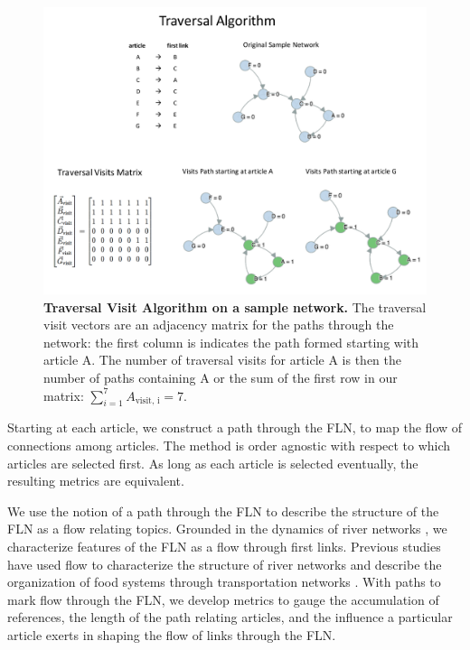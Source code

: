 \documentclass[pre,twocolumn,twoside,superscriptaddress,floatfix, aps, 10pt]{revtex4-1}
\begin{document}
\begin{figure}[tp!]
  \includegraphics[width=\textwidth]{graphics/traversal_visit_algo_figure.pdf}  
  \caption{
    \textbf{Traversal Visit Algorithm on a sample network.}
     The traversal visit vectors are an adjacency matrix for the paths through the network: the first column is indicates the path formed starting with article A. The number of traversal visits for article A is then the number of paths containing A or the sum of the first row in our matrix:
     $\sum_{i=1}^7 A_{\text{visit, i}} = 7$.
  }
  \label{fig:Traversal Visits}
\end{figure}

Starting at each article, we construct a path through the FLN, 
to map the flow of connections among articles.
The method is order agnostic with respect to which articles are selected first. As long as each article is selected eventually, the resulting metrics are equivalent.

We use the notion of a path through the FLN to describe 
the structure of the FLN as a flow relating topics. 
Grounded in the dynamics of river networks
\cite{geo_basins},
we characterize features of the FLN as a flow through first links.
Previous studies have used flow to characterize the structure of river networks
\cite{dodds} and describe the organization of food systems through transportation networks
\cite{food_webs}.
With paths to mark flow through the FLN, we develop metrics to 
gauge the accumulation of references, 
the length of the path relating articles, and the influence a particular
article exerts in shaping the flow of links through the FLN.
\end{document}
